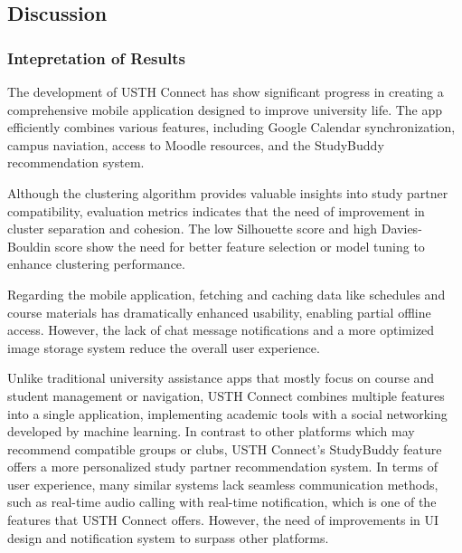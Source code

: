 \documentclass{article}
\makeatletter
\newcommand\subsubsubsection{\@startsection{paragraph}{4}{\z@}{-2.5ex\@plus -1ex \@minus -.25ex}{1.25ex \@plus .25ex}{\normalfont\normalsize\bfseries}}
\makeatother
\begin{document}
\subsection{Discussion}
\subsubsection{Intepretation of Results}
The development of USTH Connect has show significant progress in creating a comprehensive mobile application designed to improve university life.
The app efficiently combines various features, including Google Calendar synchronization, campus naviation, access to Moodle resources, and the StudyBuddy recommendation system.

Although the clustering algorithm provides valuable insights into study partner compatibility, evaluation metrics indicates that the need of improvement in cluster separation and cohesion.
The low Silhouette score and high Davies-Bouldin score show the need for better feature selection or model tuning to enhance clustering performance.

Regarding the mobile application, fetching and caching data like schedules and course materials has dramatically enhanced usability, enabling partial offline access.
However, the lack of chat message notifications and a more optimized image storage system reduce the overall user experience.

\subsubsubsection{Comparison to Similar System}
Unlike traditional university assistance apps that mostly focus on course and student management or navigation, USTH Connect combines multiple features into a single application, implementing academic tools with a social networking developed by machine learning.
In contrast to other platforms which may recommend compatible groups or clubs, USTH Connect's StudyBuddy feature offers a more personalized study partner recommendation system.
In terms of user experience, many similar systems lack seamless communication methods, such as real-time audio calling with real-time notification, which is one of the features that USTH Connect offers.
However, the need of improvements in UI design and notification system to surpass other platforms.
\end{document}
